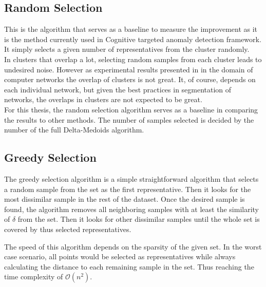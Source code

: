 \documentclass[thesis=B,english]{FITthesis}[2012/10/20]
\begin{document}
                                                                                  
\subsection{Random Selection}                                                     
                                                                                  
This is the algorithm that serves as a baseline to measure the improvement as it is the method currently used in Cognitive targeted anomaly detection framework.
It simply selects a given number of representatives from the cluster randomly. \\

In clusters that overlap a lot, selecting random samples from each cluster leads to undesired noise.
However as experimental results presented in \cite{kopp2018community} in the domain of computer networks the overlap of clusters is not great.
It, of course, depends on each individual network, but given the best practices in segmentation of networks, the overlaps in clusters are not expected to be great. \\

For this thesis, the random selection algorithm serves as a baseline in comparing the results to other methods.
The number of samples selected is decided by the number of the full Delta-Medoids algorithm.

\subsection{Greedy Selection} %

The greedy selection algorithm is a simple straightforward algorithm that selects a random sample from the set as the first representative.
Then it looks for the most dissimilar sample in the rest of the dataset.
Once the desired sample is found, the algorithm removes all neighboring samples with at least the similarity of $\delta$ from the set.
Then it looks for other dissimilar samples until the whole set is covered by thus selected representatives. \\ 

The speed of this algorithm depends on the sparsity of the given set.
In the worst case scenario, all points would be selected as representatives while always calculating the distance to each remaining sample in the set.
Thus reaching the time complexity of $\mathcal{O}(n^2)$.
\end{document}
